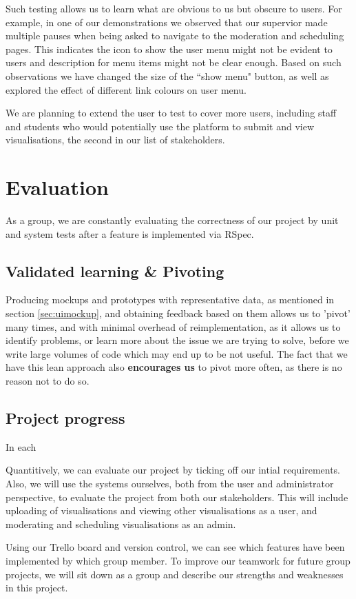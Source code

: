 \documentclass[a4paper]{article}
\begin{document}
Such testing allows us to learn what are obvious to us but obscure to users.
For example, in one of our demonstrations we observed that our supervior 
made multiple pauses when
being asked to navigate to the moderation and scheduling pages. This 
indicates the icon to show the user menu might not be evident to users and
description for menu items might not be clear enough. Based on such observations
we have changed the size of the ``show menu" button, as well as explored the effect
of different link colours on user menu.

We are planning to extend the user to test to cover more users, including staff
and students who would potentially use the platform to submit and 
view visualisations, the second in our list of stakeholders.

\section{Evaluation}
As a group, we are constantly evaluating the correctness of our project by 
unit and system tests after a feature is implemented via RSpec. 



\subsection{Validated learning \& Pivoting}
Producing mockups and prototypes with representative data, as mentioned
in section \ref{sec:uimockup}, and obtaining feedback based on them allows
us to 'pivot' many times, and with minimal overhead
of reimplementation, as it allows us to identify problems, or learn more about
the issue we are trying to solve, before we write large volumes of code which
may end up to be not useful. The fact that we have this lean approach also
\textbf{encourages us} to pivot more often, as there is no reason not to do so.

\subsection{Project progress}
In each 


Quantitively, we can evaluate our project by ticking off our intial 
requirements. Also, we will use the systems ourselves, both from the user 
and administrator perspective, to evaluate the project from both our stakeholders.
This will include uploading of visualisations and viewing other visualisations as a
user, and moderating and scheduling visualisations as an admin.

Using our Trello board and version control, we can see which features have been 
implemented by which group member. To improve our teamwork for future group 
projects, we will sit down as a group and describe our strengths and weaknesses in 
this project.



\end{document}
